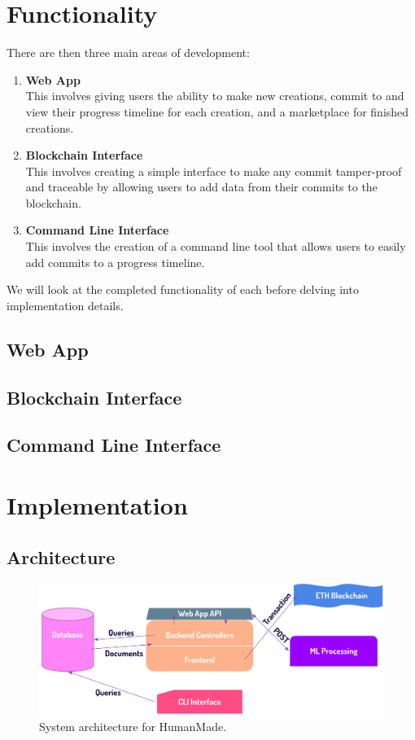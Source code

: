 \documentclass[12pt,a4paper]{article}
\begin{document}
\section{Functionality}
There are then three main areas of development:
\begin{enumerate}
    \item \textbf{Web App} \\This involves giving users the ability to make new creations, commit to and view their progress timeline for each creation, and a marketplace for finished creations.
    \item \textbf{Blockchain Interface} \\This involves creating a simple interface to make any commit tamper-proof and traceable by allowing users to add data from their commits to the blockchain.
    \item \textbf{Command Line Interface} \\This involves the creation of a command line tool that allows users to easily add commits to a progress timeline.
\end{enumerate}
We will look at the completed functionality of each before delving into implementation details.
\subsection{Web App}
\subsection{Blockchain Interface}
\subsection{Command Line Interface}


\section{Implementation}
\subsection{Architecture}
\begin{figure}[H]
    \centering
    \includegraphics[scale=0.6]{architecture.png}
    \caption{System architecture for HumanMade. \cite{gpt4}}
\end{figure}
\end{document}
